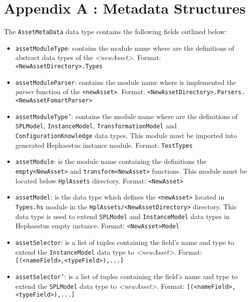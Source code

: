 \section{Appendix A : Metadata Structures}
\label{sec:appendixA}

The \texttt{AssetMetaData} data type contains the following fields outlined below:

\begin{itemize}
 
\item \texttt{assetModuleType}: contains the module name where are the definitions of abstract data types of the \textit{<newAsset>}. Format: \texttt{<NewAssetDirectory>.Types}

\item \texttt{assetModuleParser}: contains the module name where is implemented the \textit{parser} function of the \texttt{<newAsset>}. Format: \texttt{<NewAssetDirectory>.Parsers.<NewAssetFomartParser>}

\item \texttt{assetModuleType'}: contains the module name where are the definitions of \texttt{SPLModel}, \texttt{InstanceModel}, \texttt{TransformationModel} and \texttt{ConfigurationKnowledge} data types. This module must be imported into generated Hephaestus instance module. Format: \texttt{TestTypes}

\item \texttt{assetModule}: is the module name containing the definitions the \texttt{empty<NewAsset>} and \texttt{transform<NewAsset>} functions. This module must be located below \texttt{HplAssets} directory. Format: \texttt{<NewAsset>}

\item \texttt{assetModel}: is the data type which defines the \texttt{<newAsset>} located in \texttt{Types.hs} module in the \texttt{HplAssets/<NewAssetDirectory>} directory. This data type is used to extend \texttt{SPLModel} and \texttt{InstanceModel} data types in Hephaestus empty instance. Format: \texttt{<NewAsset>Model}

\item \texttt{assetSelector}: is a list of tuples containing the field's name and type to extend the \texttt{InstanceModel} data type to \textit{<newAsset>}. Format: \texttt{[(<nameField>,<typeField>),...]}

\item \texttt{assetSelector'}: is a list of tuples containing the field's name and type to extend the \texttt{SPLModel} data type to \textit{<newAsset>}. Format: \texttt{[(<nameField>,<typeField>),...]}


\end{itemize}
